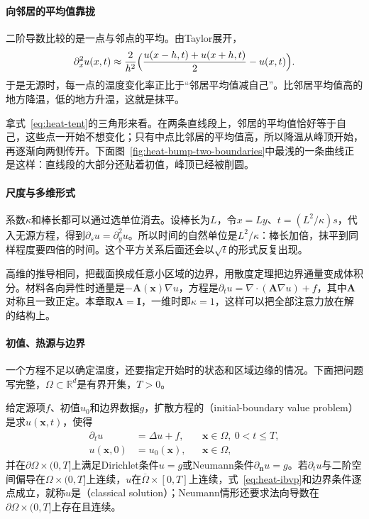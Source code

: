 \paragraph{向邻居的平均值靠拢}
二阶导数比较的是一点与邻点的平均。由Taylor展开，
\[
 \partial_x^2u(x,t)\approx\frac{2}{h^2}\Bigl(\frac{u(x-h,t)+u(x+h,t)}{2}-u(x,t)\Bigr) .
\]
于是无源时，每一点的温度变化率正比于“邻居平均值减自己”。比邻居平均值高的地方降温，低的地方升温，这就是抹平。

拿式~\eqref{eq:heat-tent}的三角形来看。在两条直线段上，邻居的平均值恰好等于自己，这些点一开始不想变化；只有中点比邻居的平均值高，所以降温从峰顶开始，再逐渐向两侧传开。下面图~\ref{fig:heat-bump-two-boundaries}中最浅的一条曲线正是这样：直线段的大部分还贴着初值，峰顶已经被削圆。

\paragraph{尺度与多维形式}
系数$\kappa$和棒长都可以通过选单位消去。设棒长为$L$，令$x=Ly$、$t=(L^2/\kappa)s$，代入无源方程，得到$\partial_su=\partial_y^2u$。所以时间的自然单位是$L^2/\kappa$：棒长加倍，抹平到同样程度要四倍的时间。这个平方关系后面还会以$\sqrt{t}$的形式反复出现。

高维的推导相同，把截面换成任意小区域的边界，用散度定理把边界通量变成体积分。材料各向异性时通量是$-\bm{A}(\bm{x})\nabla u$，方程是$\partial_tu=\nabla\cdot(\bm{A}\nabla u)+f$，其中$\bm{A}$对称且一致正定。本章取$\bm{A}=\bm{I}$，一维时即$\kappa=1$，这样可以把全部注意力放在解的结构上。

\paragraph{初值、热源与边界}
一个方程不足以确定温度，还要指定开始时的状态和区域边缘的情况。下面把问题写完整，$\Omega\subset\mathbb{R}^{d}$是有界开集，$T>0$。

\begin{definition}[初边值问题]
\label{def:heat-ibvp}
给定源项$f$、初值$u_0$和边界数据$g$，扩散方程的（initial-boundary value problem）是求$u(\bm{x},t)$，使得
\begin{equation}
 \begin{aligned}
  \partial_tu&=\Delta u+f, && \bm{x}\in\Omega,\ 0<t\leq T,\\
  u(\bm{x},0)&=u_0(\bm{x}), && \bm{x}\in\Omega,
 \end{aligned}
 \label{eq:heat-ibvp}
\end{equation}
并在$\partial\Omega\times(0,T]$上满足Dirichlet条件$u=g$或Neumann条件$\partial_{\bm{n}}u=g$。若$\partial_tu$与二阶空间偏导在$\Omega\times(0,T]$上连续，$u$在$\overline\Omega\times[0,T]$上连续，式~\eqref{eq:heat-ibvp}和边界条件逐点成立，就称$u$是（classical solution）；Neumann情形还要求法向导数在$\partial\Omega\times(0,T]$上存在且连续。
\end{definition}

